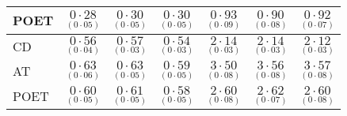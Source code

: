 \documentclass[11pt,oneside]{amsart}
\begin{document}
\begin{table}[htbp!]
\begin{multicols}{7}
\begin{tabular}{|p{1.92cm}|p{1.92cm}|p{1.92cm}|p{1.92cm}|p{1.92cm}|p{1.92cm}|p{1.92cm}|}
POET & ${\underset{(0\cdot05)}{0\cdot28}}$ & ${\underset{(0\cdot05)}{0\cdot30}}$ & ${\underset{(0\cdot05)}{0\cdot30}}$ & ${\underset{(0\cdot09)}{0\cdot93}}$ & ${\underset{(0\cdot08)}{0\cdot90}}$ & ${\underset{(0\cdot07)}{0\cdot92}}$ \\ 
\hline
\hline
CD & ${\underset{(0\cdot04)}{0\cdot56}}$ & ${\underset{(0\cdot03)}{0\cdot57}}$ & ${\underset{(0\cdot03)}{0\cdot54}}$ & ${\underset{(0\cdot03)}{2\cdot14}}$ & ${\underset{(0\cdot03)}{2\cdot14}}$ & ${\underset{(0\cdot03)}{2\cdot12}}$ \\  
AT & ${\underset{(0\cdot06)}{0\cdot63}}$ & ${\underset{(0\cdot05)}{0\cdot63}}$ & ${\underset{(0\cdot05)}{0\cdot59}}$ & ${\underset{(0\cdot08)}{3\cdot50}}$ & ${\underset{(0\cdot08)}{3\cdot56}}$ & ${\underset{(0\cdot08)}{3\cdot57}}$ \\ 
POET & ${\underset{(0\cdot05)}{0\cdot60}}$ & ${\underset{(0\cdot05)}{0\cdot61}}$ & ${\underset{(0\cdot05)}{0\cdot58}}$ & ${\underset{(0\cdot08)}{2\cdot60}}$ & ${\underset{(0\cdot07)}{2\cdot62}}$ & ${\underset{(0\cdot08)}{2\cdot60}}$ \\ 
\hline
\end{tabular}
\end{multicols}
\end{table}
\end{document}
